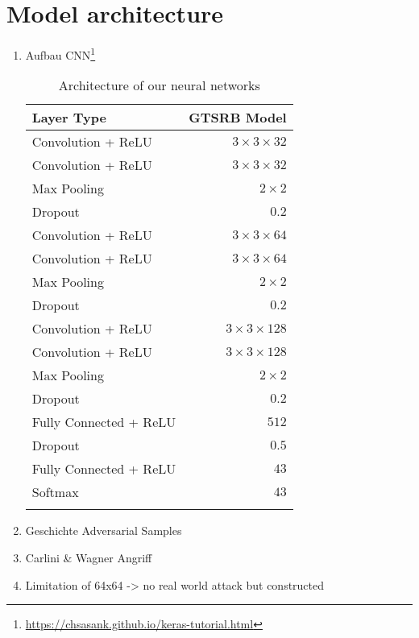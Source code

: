 
\section{Model architecture}

\begin{enumerate}
\item Aufbau CNN\footnote{\url{https://chsasank.github.io/keras-tutorial.html}}

\begin{table}[!h]
\centering
\begin{tabular}{ l r }
\hline

Layer Type & GTSRB Model \\
\hline

  Convolution + ReLU & $3 \times 3 \times 32$ \\
  Convolution + ReLU & $3 \times 3 \times 32$  \\
  Max Pooling & $2 \times 2$ \\
  Dropout & $0.2$ \\

  Convolution + ReLU & $3 \times 3 \times 64$ \\
  Convolution + ReLU & $3 \times 3 \times 64$ \\
  Max Pooling & $2 \times 2$ \\
  Dropout & $0.2$ \\
  
  Convolution + ReLU & $3 \times 3 \times 128$ \\
  Convolution + ReLU & $3 \times 3 \times 128$ \\
  Max Pooling & $2 \times 2$ \\
  Dropout & $0.2$ \\
    
  Fully Connected + ReLU & $512$\\
  Dropout & $0.5$ \\

  Fully Connected + ReLU & $43$\\
  
  Softmax & $43$ \\ \hline 
  \vspace{1.5pt}
\end{tabular}
\caption{Architecture of our neural networks}
\label{table:model}
\end{table}
\item Geschichte Adversarial Samples
\item Carlini \& Wagner Angriff \cite{carlini2017towards}
\item Limitation of 64x64 -> no real world attack but constructed
\end{enumerate}